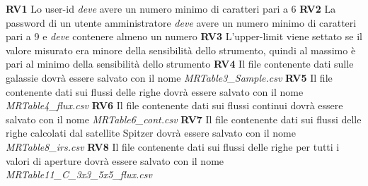 \documentclass[12pt,a4paper,onecolumn,x11names]{article}
\begin{document}
		\begin{flushleft}
			\textbf{RV1} Lo user-id \textit{deve} avere un numero minimo di caratteri pari a 6\newline
			\textbf{RV2} La password di un utente amministratore \textit{deve} avere un numero minimo di caratteri pari a 9 e \textit{deve} contenere almeno un numero\newline
			\textbf{RV3} L'upper-limit viene settato se il valore misurato era minore della sensibilità dello strumento, quindi al massimo è pari al minimo della sensibilità dello strumento\newline
			\textbf{RV4} Il file contenente dati sulle galassie dovrà essere salvato con il nome \textit{MRTable3\_Sample.csv}\newline
			\textbf{RV5} Il file contenente dati sui flussi delle righe dovrà essere salvato con il nome \textit{MRTable4\_flux.csv}\newline
			\textbf{RV6} Il file contenente dati sui flussi continui dovrà essere salvato con il nome \textit{MRTable6\_cont.csv}\newline
			\textbf{RV7} Il file contenente dati sui flussi delle righe calcolati dal satellite Spitzer dovrà essere salvato con il nome \textit{MRTable8\_irs.csv}\newline
			\textbf{RV8} Il file contenente dati sui flussi delle righe per tutti i valori di aperture dovrà essere salvato con il nome \textit{MRTable11\_C\_3x3\_5x5\_flux.csv}\newline
		\end{flushleft}

%			
		
\end{document}
